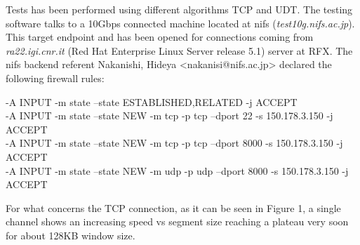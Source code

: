 \documentclass[10pt,a4paper,draft]{article}
\begin{document}
Tests has been performed using different algorithms TCP and UDT. The testing software talks to a 10Gbps connected machine located at nifs (\emph{test10g.nifs.ac.jp}). This target endpoint and has been opened for connections coming from \emph{ra22.igi.cnr.it} (Red Hat Enterprise Linux Server release 5.1) server at RFX. The nifs backend referent Nakanishi, Hideya <nakanisi@nifs.ac.jp> declared the following firewall rules:

\begin{table}
{ \footnotesize
-A INPUT -m state --state ESTABLISHED,RELATED -j ACCEPT \\
-A INPUT -m state --state NEW -m tcp -p tcp --dport 22 -s 150.178.3.150 -j ACCEPT \\
-A INPUT -m state --state NEW -m tcp -p tcp --dport 8000 -s 150.178.3.150 -j ACCEPT \\
-A INPUT -m state --state NEW -m udp -p udp --dport 8000 -s 150.178.3.150 -j ACCEPT
}
\end{table}


For what concerns the TCP connection, as it can be seen in Figure 1, a single channel shows an increasing speed vs segment size reaching a plateau very soon for about 128KB window size.
\end{document}
